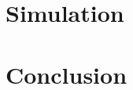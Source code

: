 \documentclass[letterpaper, 10 pt, conference]{ieeeconf}  %
\begin{document}











\section{Simulation}

\section{Conclusion}



\end{document}
